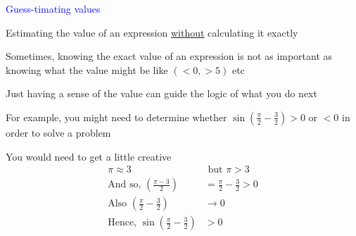 \documentclass[14pt,fleqn]{extarticle}
\begin{document}
 
\begin{skill}
    \begin{narrow}
         \textcolor{blue}{Guess-timating values}
         
         Estimating the value of an expression \underline{without} 
         calculating it exactly 
    \end{narrow}
    
    \reason 
    
    Sometimes, knowing the exact value of an expression is not as important 
    as knowing what the value might be like $\left( <0, > 5\right)$ etc \newline 
    
    Just having a sense of the value can guide the logic of what you do next\newline
    
    For example, you might need to determine whether $\sin \left(\frac\pi{2} - \frac{3}{2} \right) > 0$ or $< 0$ in order to solve a problem \newline 
    
    You would need to get a little creative
    \begin{align}
    \pi \approx 3&\text{ but } \pi > 3 \\
    \text{And so, }\left(\frac{\pi-3}{2} \right) &= \frac\pi{2} - \frac{3}{2} > 0 \\
    \text{Also } \left(\frac\pi{2}-\frac{3}{2} \right) &\to 0 \\
    \text{Hence, } \sin \left(\frac\pi{2}-\frac{3}{2} \right) &> 0 
\end{align}
    
    
    
\end{skill}
\end{document}
